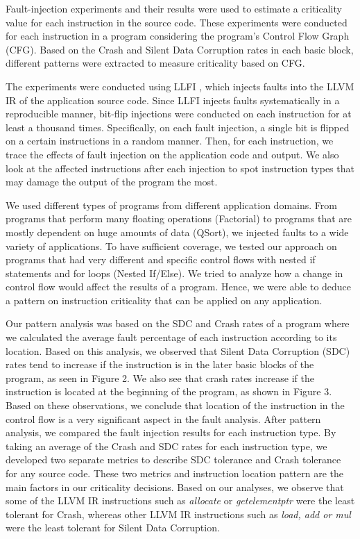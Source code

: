 Fault-injection experiments and their results were used to estimate a criticality value for each instruction in the source code. These experiments were conducted for each instruction in a program considering the program's Control Flow Graph (CFG). Based on the Crash and Silent Data Corruption rates in each basic block, different patterns were extracted to measure criticality based on CFG. 

The experiments were conducted using LLFI \cite{LLFI:2015}, which injects faults into the LLVM IR of the application source code. Since LLFI injects faults systematically in a reproducible manner, bit-flip injections were conducted on each instruction for at least a thousand times. Specifically, on each fault injection, a single bit is flipped on a certain instructions in a random manner. Then, for each instruction, we trace the effects of fault injection on the application code and output. We also look at the affected instructions after each injection to spot instruction types that may damage the output of the program the most. 

We used different types of programs from different application domains. From programs that perform many floating operations (Factorial) to programs that are mostly dependent on huge amounts of data (QSort), we injected faults to a wide variety of applications. To have sufficient coverage, we tested our approach on programs that had very different and specific control flows with nested if statements and for loops (Nested If/Else). We tried to analyze how a change in control flow would affect the results of a program. Hence, we were able to deduce a pattern on instruction criticality that can be applied on any application.
 
Our pattern analysis was based on the SDC and Crash rates of a program where we calculated the average fault percentage of each instruction according to its location. Based on this analysis, we observed that Silent Data Corruption (SDC) rates tend to increase if the instruction is in the later basic blocks of the program, as seen in Figure 2. We also see that crash rates increase if the instruction is located at the beginning of the program, as shown in Figure 3. Based on these observations, we conclude that location of the instruction in the control flow is a very significant aspect in the fault analysis. After pattern analysis, we compared the fault injection results for each instruction type. By taking an average of the Crash and SDC rates for each instruction type, we developed two separate metrics to describe SDC tolerance and Crash tolerance for any source code. These two metrics and instruction location pattern are the main factors in our criticality decisions. Based on our analyses, we observe that some of the LLVM IR instructions such as {\em allocate} or {\em getelementptr} were the least tolerant for Crash, whereas other LLVM IR instructions such as {\em load, add or mul} were the least tolerant for Silent Data Corruption. 

